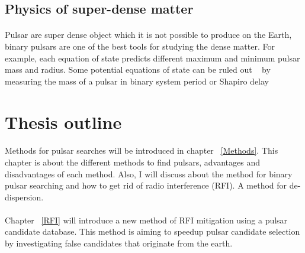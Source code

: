\documentclass[thesis_msc.tex]{subfiles}
\begin{document}
  
   \subsection{Physics of super-dense matter}
    \paragraph{} Pulsar are super dense object which it is not possible to produce on the Earth, binary pulsars are one of the best tools for studying the dense matter. For example, each equation of state predicts different maximum and minimum pulsar mass and radius. %
    Some potential equations of state can be ruled out ~\citep{ozel2016masses} by measuring the mass of a pulsar in binary system period or Shapiro delay  

\section{Thesis outline}
    \paragraph{} Methods for pulsar searches will be introduced in chapter ~\ref{Methods}. This chapter is about the different methods to find pulsars, advantages and disadvantages of each method. Also, I will discuss about the method for binary pulsar searching and how to get rid of radio interference (RFI). A method for de-dispersion.
    \paragraph{} Chapter ~\ref{RFI} will introduce a new method of RFI mitigation using a pulsar candidate database. This method is aiming to speedup pulsar candidate selection by investigating false candidates that originate from the earth. 
\end{document}
